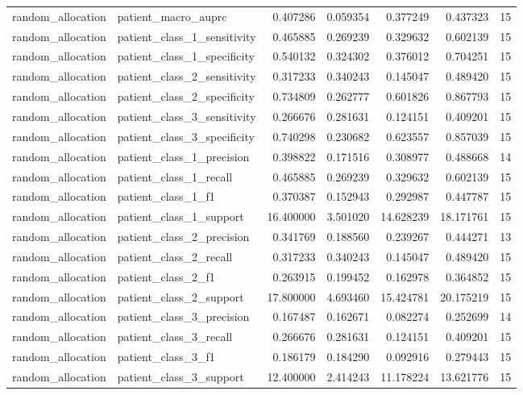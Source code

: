 \begin{tabular}{llrrrrr}
random_allocation & patient_macro_auprc & 0.407286 & 0.059354 & 0.377249 & 0.437323 & 15 \\
random_allocation & patient_class_1_sensitivity & 0.465885 & 0.269239 & 0.329632 & 0.602139 & 15 \\
random_allocation & patient_class_1_specificity & 0.540132 & 0.324302 & 0.376012 & 0.704251 & 15 \\
random_allocation & patient_class_2_sensitivity & 0.317233 & 0.340243 & 0.145047 & 0.489420 & 15 \\
random_allocation & patient_class_2_specificity & 0.734809 & 0.262777 & 0.601826 & 0.867793 & 15 \\
random_allocation & patient_class_3_sensitivity & 0.266676 & 0.281631 & 0.124151 & 0.409201 & 15 \\
random_allocation & patient_class_3_specificity & 0.740298 & 0.230682 & 0.623557 & 0.857039 & 15 \\
random_allocation & patient_class_1_precision & 0.398822 & 0.171516 & 0.308977 & 0.488668 & 14 \\
random_allocation & patient_class_1_recall & 0.465885 & 0.269239 & 0.329632 & 0.602139 & 15 \\
random_allocation & patient_class_1_f1 & 0.370387 & 0.152943 & 0.292987 & 0.447787 & 15 \\
random_allocation & patient_class_1_support & 16.400000 & 3.501020 & 14.628239 & 18.171761 & 15 \\
random_allocation & patient_class_2_precision & 0.341769 & 0.188560 & 0.239267 & 0.444271 & 13 \\
random_allocation & patient_class_2_recall & 0.317233 & 0.340243 & 0.145047 & 0.489420 & 15 \\
random_allocation & patient_class_2_f1 & 0.263915 & 0.199452 & 0.162978 & 0.364852 & 15 \\
random_allocation & patient_class_2_support & 17.800000 & 4.693460 & 15.424781 & 20.175219 & 15 \\
random_allocation & patient_class_3_precision & 0.167487 & 0.162671 & 0.082274 & 0.252699 & 14 \\
random_allocation & patient_class_3_recall & 0.266676 & 0.281631 & 0.124151 & 0.409201 & 15 \\
random_allocation & patient_class_3_f1 & 0.186179 & 0.184290 & 0.092916 & 0.279443 & 15 \\
random_allocation & patient_class_3_support & 12.400000 & 2.414243 & 11.178224 & 13.621776 & 15 \\

\end{tabular}
